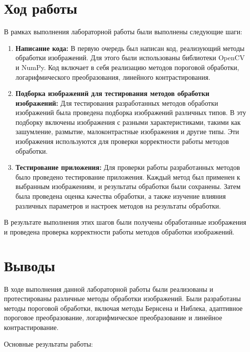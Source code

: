 \documentclass{article}
\begin{document}
    \section{Ход работы}

    В рамках выполнения лабораторной работы были выполнены следующие шаги:

    \begin{enumerate}
        \item \textbf{Написание кода:} В первую очередь был написан код, реализующий методы обработки изображений. Для этого были использованы библиотеки OpenCV и NumPy. Код включает в себя реализацию методов пороговой обработки, логарифмического преобразования, линейного контрастирования.

        \item \textbf{Подборка изображений для тестирования методов обработки изображений:} Для тестирования разработанных методов обработки изображений была проведена подборка изображений различных типов. В эту подборку включены изображения с разными характеристиками, такими как зашумление, размытие, малоконтрастные изображения и другие типы. Эти изображения используются для проверки корректности работы методов обработки.

        \item \textbf{Тестирование приложения:} Для проверки работы разработанных методов было проведено тестирование приложения. Каждый метод был применен к выбранным изображениям, и результаты обработки были сохранены. Затем была проведена оценка качества обработки, а также изучение влияния различных параметров и настроек методов на результаты обработки.

    \end{enumerate}

    В результате выполнения этих шагов были получены обработанные изображения и проведена проверка корректности работы методов обработки изображений.


    \section{Выводы}

    В ходе выполнения данной лабораторной работы были реализованы и протестированы различные методы обработки изображений. Были разработаны методы пороговой обработки, включая методы Бернсена и Ниблека, адаптивное пороговое преобразование, логарифмическое преобразование и линейное контрастирование.

    Основные результаты работы:
\end{document}
